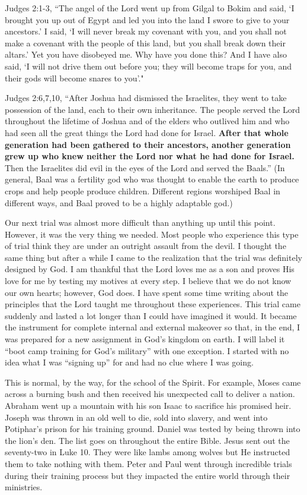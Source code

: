 \documentclass[twoside, 12pt]{book}
\begin{document}
Judges 2:1-3,  “The angel of the Lord went up from Gilgal to Bokim and said, ‘I brought you up out of Egypt and led you into the land I swore to give to your ancestors.’ I said, ‘I will never break my covenant with you, and you shall not make a covenant with the people of this land, but you shall break down their altars.’ Yet you have disobeyed me. Why have you done this? And I have also said, ‘I will not drive them out before you; they will become traps for you, and their gods will become snares to you’."

Judges 2:6,7,10, “After Joshua had dismissed the Israelites, they went to take possession of the land, each to their own inheritance. The people served the Lord throughout the lifetime of Joshua and of the elders who outlived him and who had seen all the great things the Lord had done for Israel. \textbf{After that whole generation had been gathered to their ancestors, another generation grew up who knew neither the Lord nor what he had done for Israel.} Then the Israelites did evil in the eyes of the Lord and served the Baals.” (In general, Baal was a fertility god who was thought to enable the earth to produce crops and help people produce children. Different regions worshiped Baal in different ways, and Baal proved to be a highly adaptable god.)

Our next trial was almost more difficult than anything up until this point. However, it was the very thing we needed. Most people who experience this type of trial think they are under an outright assault from the devil. I thought the same thing but after a while I came to the realization that the trial was definitely designed by God. I am thankful that the Lord loves me as a son and proves His love for me by testing my motives at every step. I believe that we do not know our own hearts; however, God does. I have spent some time writing about the principles that the Lord taught me throughout these experiences. This trial came suddenly and lasted a lot longer than I could have imagined it would. It became the instrument for complete internal and external makeover so that, in the end, I was prepared for a new assignment in God’s kingdom on earth. I will label it “boot camp training for God’s military” with one exception. I started with no idea what I was “signing up” for and had no clue where I was going. 

This is normal, by the way, for the school of the Spirit. For example, Moses came across a burning bush and then received his unexpected call to deliver a nation. Abraham went up a mountain with his son Isaac to sacrifice his promised heir. Joseph was thrown in an old well to die, sold into slavery, and went into Potiphar's prison for his training ground. Daniel was tested by being thrown into the lion's den. The list goes on throughout the entire Bible. Jesus sent out the seventy-two in Luke 10. They were like lambs among wolves but He instructed them to take nothing with them. Peter and Paul went through incredible trials during their training process but they impacted the entire world through their ministries.
\end{document}

